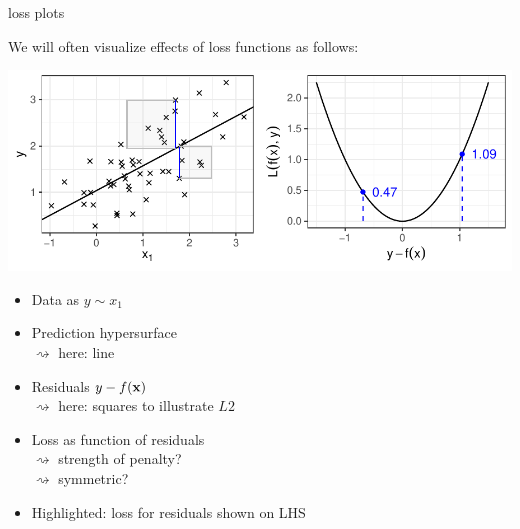 \documentclass[11pt,compress,t,notes=noshow, xcolor=table]{beamer}
\begin{document}
\begin{frame}{loss plots}

We will often visualize effects of loss functions as follows:

\vfill

\includegraphics[width=\textwidth]{figure/reg_l2_lossplot_quad.pdf}

\hspace{0.5cm}
\begin{minipage}[t]{0.45\textwidth}
    \footnotesize
    \begin{itemize}
        \item Data as $y \sim x_1$
        \item Prediction hypersurface \\$\rightsquigarrow$ here: line
        \item Residuals $y - f(\mathbf{x})$ 
        \\$\rightsquigarrow$ here: squares to illustrate $L2$
    \end{itemize}
\end{minipage}
\hfill
\begin{minipage}[t]{0.4\textwidth}
    \footnotesize
    \begin{itemize}
        \item Loss as function of residuals
        \\$\rightsquigarrow$ strength of penalty? 
        \\$\rightsquigarrow$ symmetric?
        \item Highlighted: loss for residuals shown on LHS
    \end{itemize}
\end{minipage}

\end{frame}

\end{document}
